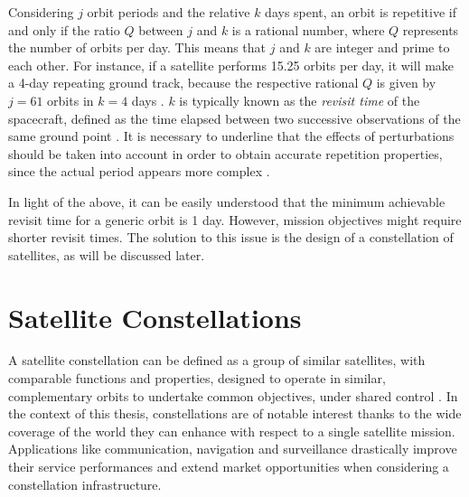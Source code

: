 Considering $j$ orbit periods and the relative $k$ days spent, an orbit is repetitive if and only if the ratio $Q$ between $j$ and $k$ is a rational number, where $Q$ represents the number of orbits per day.
This means that $j$ and $k$ are integer and prime to each other.
For instance, if a satellite performs 15.25 orbits per day, it will make a 4-day repeating ground track, because the respective rational $Q$ is given by $j=61$ orbits in $k=4$ days \cite{wertz2009orbit}.
$k$ is typically known as the \textit{revisit time} of the spacecraft, defined as the time elapsed between two successive observations of the same ground point \cite{luo2017novel}.
It is necessary to underline that the effects of perturbations should be taken into account in order to obtain accurate repetition properties, since the actual period appears more complex \cite{wertz2009orbit}. 

In light of the above, it can be easily understood that the minimum achievable revisit time for a generic orbit is 1 day.
However, mission objectives might require shorter revisit times.
The solution to this issue is the design of a constellation of satellites, as will be discussed later.



\section{Satellite Constellations}
A satellite constellation can be defined as a group of similar satellites, with comparable functions and properties, designed to operate in similar, complementary orbits to undertake common objectives, under shared control \cite{wood2003satellite}.
In the context of this thesis, constellations are of notable interest thanks to the wide coverage of the world they can enhance with respect to a single satellite mission. 
Applications like communication, navigation and surveillance drastically improve their service performances and extend market opportunities when considering a constellation infrastructure.


